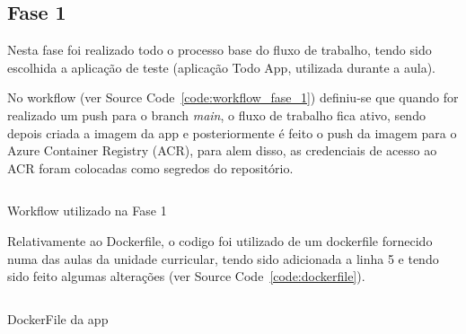 \subsection{Fase 1}

    \par Nesta fase foi realizado todo o processo base do fluxo de trabalho, tendo sido escolhida a aplicação de teste (aplicação Todo App, utilizada durante a aula).

    \par No workflow (ver Source Code~\ref{code:workflow_fase_1}) definiu-se que quando for realizado um push para o branch \emph{main}, o fluxo de trabalho fica ativo, sendo depois criada a imagem da app e posteriormente é feito o push da imagem para o Azure Container Registry (ACR), para alem disso, as credenciais de acesso ao ACR foram colocadas como segredos do repositório.

    \begin{code}
        \inputminted[linenos,tabsize=1,breaklines,lastline=21]{yaml}{../.github/workflows/project-workflow-fase-1.yml}
        \caption{Workflow utilizado na Fase 1}
        \label{code:workflow_fase_1}
    \end{code}

    \par Relativamente ao Dockerfile, o codigo foi utilizado de um dockerfile fornecido numa das aulas da unidade curricular, tendo sido adicionada a linha 5 e tendo sido feito algumas alterações (ver Source Code~\ref{code:dockerfile}).

    \begin{code}
        \inputminted[linenos,tabsize=1,breaklines]{dockerfile}{../todo_app/app/Dockerfile}
        \caption{DockerFile da app}
        \label{code:dockerfile}
    \end{code}

